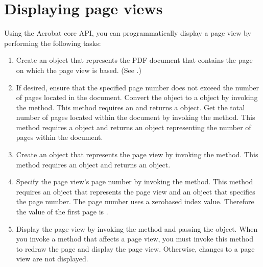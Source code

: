 \documentclass[letterpaper,12pt,english,openany,oneside]{sphinxmanual}
\begin{document}
\section{Displaying page views}
\label{\detokenize{Plugins_Pages:displaying-page-views}}
Using the Acrobat core API, you can programmatically display a page view by performing the following tasks:
\begin{enumerate}
%
\item {} 
Create an  object that represents the PDF document that contains the page on which the page view is based. (See .)

\item {} 
If desired, ensure that the specified page number does not exceed the number of pages located in the document. Convert the  object to a  object by invoking the  method. This method requires an  and returns a  object. Get the total number of pages located within the document by invoking the  method. This method requires a  object and returns an  object representing the number of pages within the document.

\item {} 
Create an  object that represents the page view by invoking the  method. This method requires an  object and returns an  object.

\item {} 
Specify the page view’s page number by invoking the  method. This method requires an  object that represents the page view and an  object that specifies the page number. The page number uses a zero\sphinxhyphen{}based index value. Therefore the value of the first page is .

\item {} 
Display the page view by invoking the  method and passing the  object. When you invoke a method that affects a page view, you must invoke this method to redraw the page and display the page view. Otherwise, changes to a page view are not displayed.

\end{enumerate}
\end{document}
